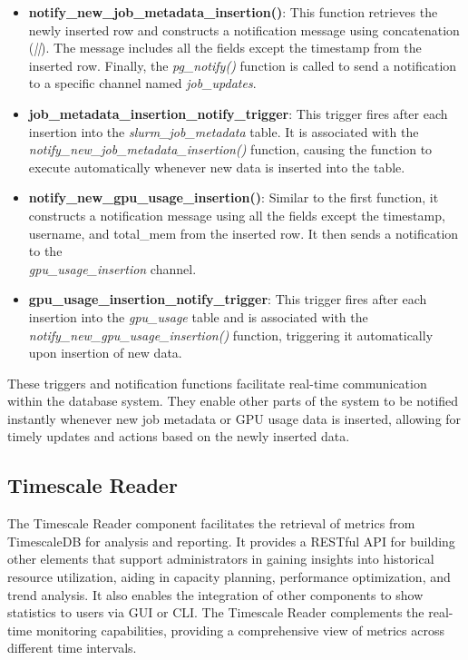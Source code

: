 \begin{itemize}
    \item \textbf{notify\_new\_job\_metadata\_insertion()}: This function retrieves the newly inserted row and constructs a notification message using concatenation (\textit{||}). The message includes all the fields except the timestamp from the inserted row. Finally, the \textit{pg\_notify()} function is called to send a notification to a specific channel named \textit{job\_updates}.
    \item \textbf{job\_metadata\_insertion\_notify\_trigger}: This trigger fires after each insertion into the \textit{slurm\_job\_metadata} table. It is associated with the \\
    \textit{notify\_new\_job\_metadata\_insertion()} function, causing the function to execute automatically whenever new data is inserted into the table.
    \item \textbf{notify\_new\_gpu\_usage\_insertion()}: Similar to the first function, it constructs a notification message using all the fields except the timestamp, username, and total\_mem from the inserted row. It then sends a notification to the \\ \textit{gpu\_usage\_insertion} channel.
    \item \textbf{gpu\_usage\_insertion\_notify\_trigger}: This trigger fires after each insertion into the \textit{gpu\_usage} table and is associated with the \textit{notify\_new\_gpu\_usage\_insertion()} function, triggering it automatically upon insertion of new data.
\end{itemize}

These triggers and notification functions facilitate real-time communication within the database system. They enable other parts of the system to be notified instantly whenever new job metadata or GPU usage data is inserted, allowing for timely updates and actions based on the newly inserted data.

\subsection{Timescale Reader}
The Timescale Reader component facilitates the retrieval of metrics from TimescaleDB for analysis and reporting. It provides a RESTful API for building other elements that support administrators in gaining insights into historical resource utilization, aiding in capacity planning, performance optimization, and trend analysis. It also enables the integration of other components to show statistics to users via GUI or CLI. The Timescale Reader complements the real-time monitoring capabilities, providing a comprehensive view of metrics across different time intervals.


